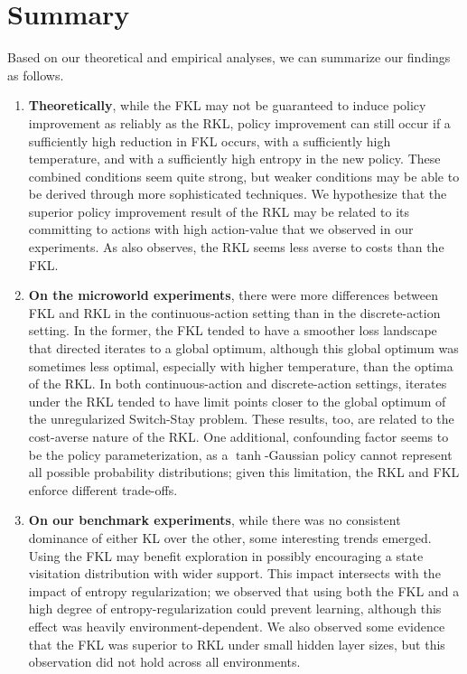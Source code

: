 \documentclass[\main/thesis.tex]{subfiles}
\begin{document}
\section{Summary}
Based on our theoretical and empirical analyses, we can summarize our findings as follows. 
\begin{enumerate}
    \item \textbf{Theoretically}, while the FKL may not be guaranteed to induce policy improvement as reliably as the RKL, policy improvement can still occur if a sufficiently high reduction in FKL occurs, with a sufficiently high temperature, and with a sufficiently high entropy in the new policy. These combined conditions seem quite strong, but weaker conditions may be able to be derived through more sophisticated techniques. We hypothesize that the superior policy improvement result of the RKL may be related to its committing to actions with high action-value that we observed in our experiments. As \citet{neumann2011variational} also observes, the RKL seems less averse to costs than the FKL. 
    \item \textbf{On the microworld experiments}, there were more differences between FKL and RKL in the continuous-action setting than in the discrete-action setting. In the former, the FKL tended to have a smoother loss landscape that directed iterates to a global optimum, although this global optimum was sometimes less optimal, especially with higher temperature, than the optima of the RKL. In both continuous-action and discrete-action settings, iterates under the RKL tended to have limit points closer to the global optimum of the unregularized Switch-Stay problem. These results, too, are related to the cost-averse nature of the RKL. One additional, confounding factor seems to be the policy parameterization, as a $\tanh$-Gaussian policy cannot represent all possible probability distributions; given this limitation, the RKL and FKL enforce different trade-offs. 
    \item \textbf{On our benchmark experiments}, while there was no consistent dominance of either KL over the other, some interesting trends emerged. Using the FKL may benefit exploration in possibly encouraging a state visitation distribution with wider support. This impact intersects with the impact of entropy regularization; we observed that using both the FKL and a high degree of entropy-regularization could prevent learning, although this effect was heavily environment-dependent. We also observed some evidence that the FKL was superior to RKL under small hidden layer sizes, but this observation did not hold across all environments. 
\end{enumerate}
\end{document}
